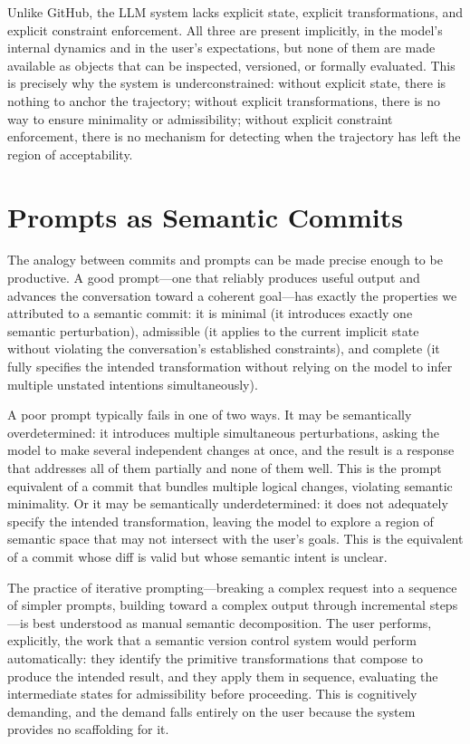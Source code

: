 \documentclass[12pt, letterpaper]{article}
\begin{document}
Unlike GitHub, the LLM system lacks explicit state, explicit transformations, and explicit constraint enforcement. All three are present implicitly, in the model's internal dynamics and in the user's expectations, but none of them are made available as objects that can be inspected, versioned, or formally evaluated. This is precisely why the system is underconstrained: without explicit state, there is nothing to anchor the trajectory; without explicit transformations, there is no way to ensure minimality or admissibility; without explicit constraint enforcement, there is no mechanism for detecting when the trajectory has left the region of acceptability.

\section{Prompts as Semantic Commits}

The analogy between commits and prompts can be made precise enough to be productive. A good prompt---one that reliably produces useful output and advances the conversation toward a coherent goal---has exactly the properties we attributed to a semantic commit: it is minimal (it introduces exactly one semantic perturbation), admissible (it applies to the current implicit state without violating the conversation's established constraints), and complete (it fully specifies the intended transformation without relying on the model to infer multiple unstated intentions simultaneously).

A poor prompt typically fails in one of two ways. It may be semantically overdetermined: it introduces multiple simultaneous perturbations, asking the model to make several independent changes at once, and the result is a response that addresses all of them partially and none of them well. This is the prompt equivalent of a commit that bundles multiple logical changes, violating semantic minimality. Or it may be semantically underdetermined: it does not adequately specify the intended transformation, leaving the model to explore a region of semantic space that may not intersect with the user's goals. This is the equivalent of a commit whose diff is valid but whose semantic intent is unclear.

The practice of iterative prompting---breaking a complex request into a sequence of simpler prompts, building toward a complex output through incremental steps---is best understood as manual semantic decomposition. The user performs, explicitly, the work that a semantic version control system would perform automatically: they identify the primitive transformations that compose to produce the intended result, and they apply them in sequence, evaluating the intermediate states for admissibility before proceeding. This is cognitively demanding, and the demand falls entirely on the user because the system provides no scaffolding for it.
\end{document}
